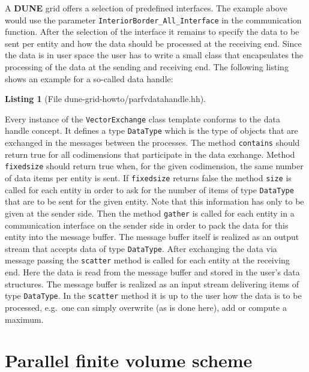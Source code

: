 \documentclass[11pt,a4paper,headinclude,footinclude,DIV16,normalheadings]{scrreprt}
\newcommand{\Dune}{{\sf\bfseries DUNE}\xspace}
\newtheorem{lst}{Listing}
\begin{document}
A \Dune{} grid offers a selection of predefined interfaces. The example
above would use the parameter \lstinline!InteriorBorder_All_Interface!
in the communication function. After the
selection of the interface it remains to specify the data to be sent
per entity and how the data should be processed at the receiving
end. Since the data is in user space the user has to write a small
class that encapsulates the processing of the data at the sending and
receiving end. The following listing shows an example for a so-called
data handle:


\begin{lst}[File dune-grid-howto/parfvdatahandle.hh] \mbox{}
\nopagebreak

\end{lst}

Every instance of the \lstinline!VectorExchange! class template
conforms to the data handle concept. It defines a type
\lstinline!DataType! which is the type of objects that are exchanged
in the messages between the processes. The method \lstinline!contains!
should return true for all codimensions that participate in the data
exchange. Method \lstinline!fixedsize! should return true when, for
the given codimension, the same number of data items per entity is
sent. If \lstinline!fixedsize! returns false the method
\lstinline!size! is called for each entity in order to ask 
for the number of items of type \lstinline!DataType! that are to be
sent for the given entity. Note that this information has only to be
given at the sender side. Then the method \lstinline!gather! is called
for each entity in a communication interface on the sender side in
order to pack the data for this entity into the message buffer. The
message buffer itself is realized as an output stream that accepts data
of type \lstinline!DataType!. After exchanging the data via message
passing the \lstinline!scatter! method is called for each entity at
the receiving end. Here the data is read from the message buffer and
stored in the user's data structures. The message buffer is realized
as an input stream delivering items of type \lstinline!DataType!. In
the \lstinline!scatter! method it is up to the user how the data is to
be processed, e.g.~one can simply overwrite (as is done here), add or
compute a maximum.

\section{Parallel finite volume scheme}
\end{document}
